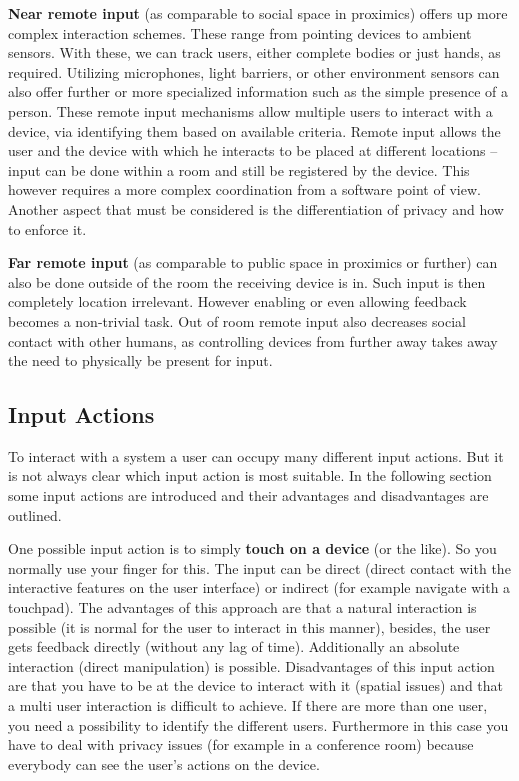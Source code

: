 \textbf{Near remote input} (as comparable to social space in proximics\cite{}) offers up more complex interaction schemes.
These range from pointing devices to ambient sensors.
With these, we can track users, either complete bodies or just hands, as required. Utilizing microphones, light barriers, or other environment sensors can also offer further or more specialized information such as the simple presence of a person.
These remote input mechanisms allow multiple users to interact with a device, via identifying them based on available criteria.
Remote input allows the user and the device with which he interacts to be placed at different locations – input can be done within a room and still be registered by the device.
This however requires a more complex coordination from a software point of view.
Another aspect that must be considered is the differentiation of privacy and how to enforce it.

\textbf{Far remote input} (as comparable to public space in proximics\cite{} or further) can also be done outside of the room the receiving device is in.
Such input is then completely location irrelevant.
However enabling or even allowing feedback becomes a non-trivial task.
Out of room remote input also decreases social contact with other humans, as controlling devices from further away takes away the need to physically be present for input.

\subsection{Input Actions}

To interact with a system a user can occupy many different input actions.
But it is not always clear which input action is most suitable.
In the following section some input actions are introduced and their advantages and disadvantages are outlined.

One possible input action is to simply \textbf{touch on a device} (or the like).
So you normally use your finger for this.
The input can be direct (direct contact with the interactive features on the user interface) or indirect (for example navigate with a touchpad).
The advantages of this approach are that a natural interaction is possible (it is normal for the user to interact in this manner), besides, the user gets feedback directly (without any lag of time). Additionally an absolute interaction (direct manipulation) is possible.
Disadvantages of this input action are that you have to be at the device to interact with it (spatial issues) and that a multi user interaction is difficult to achieve.
If there are more than one user, you need a possibility to identify the different users.
Furthermore in this case you have to deal with privacy issues (for example in a conference room) because everybody can see the user’s actions on the device.

